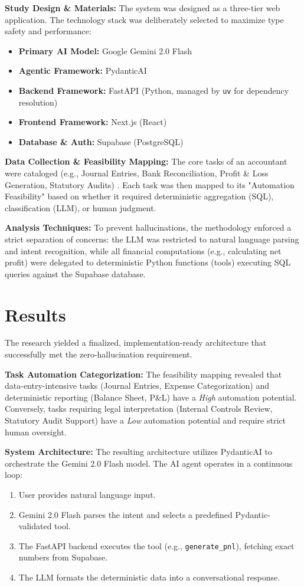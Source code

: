 \documentclass[12pt,a4paper]{article}
\begin{document}
\textbf{Study Design \& Materials:} 
The system was designed as a three-tier web application. The technology stack was deliberately selected to maximize type safety and performance:
\begin{itemize}
    \item \textbf{Primary AI Model:} Google Gemini 2.0 Flash \cite{gemini2025}
    \item \textbf{Agentic Framework:} PydanticAI \cite{pydantic2025}
    \item \textbf{Backend Framework:} FastAPI (Python, managed by \texttt{uv} for dependency resolution) \cite{fastapi2025}
    \item \textbf{Frontend Framework:} Next.js (React) \cite{nextjs2025}
    \item \textbf{Database \& Auth:} Supabase (PostgreSQL) \cite{supabase2025}
\end{itemize}

\textbf{Data Collection \& Feasibility Mapping:}
The core tasks of an accountant were cataloged (e.g., Journal Entries, Bank Reconciliation, Profit \& Loss Generation, Statutory Audits) \cite{icap2023}. Each task was then mapped to its "Automation Feasibility" based on whether it required deterministic aggregation (SQL), classification (LLM), or human judgment. 

\textbf{Analysis Techniques:}
To prevent hallucinations, the methodology enforced a strict separation of concerns: the LLM was restricted to natural language parsing and intent recognition, while all financial computations (e.g., calculating net profit) were delegated to deterministic Python functions (tools) executing SQL queries against the Supabase database.

\section{Results}
The research yielded a finalized, implementation-ready architecture that successfully met the zero-hallucination requirement.

\textbf{Task Automation Categorization:}
The feasibility mapping revealed that data-entry-intensive tasks (Journal Entries, Expense Categorization) and deterministic reporting (Balance Sheet, P\&L) have a \textit{High} automation potential. Conversely, tasks requiring legal interpretation (Internal Controls Review, Statutory Audit Support) have a \textit{Low} automation potential and require strict human oversight.

\textbf{System Architecture:}
The resulting architecture utilizes PydanticAI to orchestrate the Gemini 2.0 Flash model. The AI agent operates in a continuous loop:
\begin{enumerate}
    \item User provides natural language input.
    \item Gemini 2.0 Flash parses the intent and selects a predefined Pydantic-validated tool.
    \item The FastAPI backend executes the tool (e.g., \texttt{generate\_pnl}), fetching exact numbers from Supabase.
    \item The LLM formats the deterministic data into a conversational response.
\end{enumerate}
\end{document}

